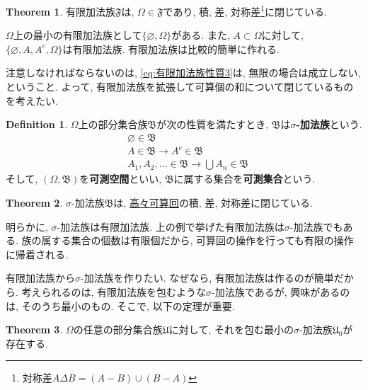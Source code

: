 \documentclass[a4j,dvipdfmx]{jsarticle}
\newcommand{\F}{\mathfrak{F}}
\newcommand{\B}{\mathfrak{B}}
\theoremstyle{definition}
\newtheorem{definition}{Definition}[section]
\theoremstyle{definition}
\newtheorem{theorem}{Theorem}[section]
\numberwithin{equation}{section}
\begin{document}
            \begin{theorem}
                有限加法族$\F$は, $\Omega \in \F$であり, 積, 差, 対称差\footnote{対称差$A\Delta B = (A-B)\cup (B-A)$}に閉じている.
            \end{theorem}

            $\Omega$上の最小の有限加法族として$\{\varnothing,\Omega\}$がある. また, $A\subset \Omega$に対して, $\{\varnothing,A,A^c,\Omega\}$は有限加法族. 
            有限加法族は比較的簡単に作れる.

            注意しなければならないのは, \eqref{eq:有限加法族性質3}は, 無限の場合は成立しない, ということ. よって, 有限加法族を拡張して可算個の和について閉じているものを考えたい.
            
            \begin{definition}
                $\Omega$上の部分集合族$\B$が次の性質を満たすとき, $\B$は\textbf{$\sigma$-加法族}という.
                \begin{align}
                    &\varnothing \in \B \label{eq:加法族性質1} \\
                    &A \in \B \rightarrow A^c \in \B \label{eq:加法族性質2} \\
                    &A_1,A_2,\dots \in \B \rightarrow \bigcup A_n \in \B \label{eq:加法族性質3}
                \end{align}
                そして, $(\Omega,\B)$を\textbf{可測空間}といい, $\B$に属する集合を\textbf{可測集合}という.
            \end{definition}

            \begin{theorem}
                $\sigma$-加法族$\B$は, \underline{高々可算回}の積, 差, 対称差に閉じている.
            \end{theorem}

            明らかに, $\sigma$-加法族は有限加法族. 上の例で挙げた有限加法族は$\sigma$-加法族でもある. 族の属する集合の個数は有限個だから, 可算回の操作を行っても有限の操作に帰着される.

            有限加法族から$\sigma$-加法族を作りたい. なぜなら, 有限加法族は作るのが簡単だから. 考えられるのは, 有限加法族を包むような$\sigma$-加法族であるが, 
            興味があるのは, そのうち最小のもの. そこで, 以下の定理が重要.
            \begin{theorem}
                $\Omega$の任意の部分集合族$\mathfrak{U}$に対して, それを包む最小の$\sigma$-加法族$\mathfrak{U}_0$が存在する.
            \end{theorem}
\end{document}
